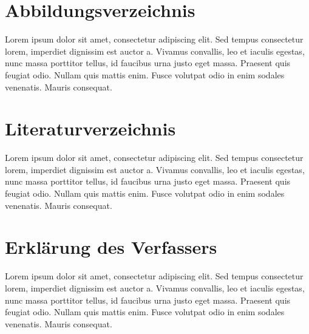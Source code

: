 \documentclass[a4paper,12pt]{article}			%
\begin{document}
\newpage
\section{Abbildungsverzeichnis}



Lorem ipsum dolor sit amet, consectetur adipiscing elit. Sed tempus consectetur lorem, imperdiet dignissim est auctor a. Vivamus convallis, leo et iaculis egestas, nunc massa porttitor tellus, id faucibus urna justo eget massa. Praesent quis feugiat odio. Nullam quis mattis enim. Fusce volutpat odio in enim sodales venenatis. Mauris consequat.


\newpage
\section{Literaturverzeichnis}



Lorem ipsum dolor sit amet, consectetur adipiscing elit. Sed tempus consectetur lorem, imperdiet dignissim est auctor a. Vivamus convallis, leo et iaculis egestas, nunc massa porttitor tellus, id faucibus urna justo eget massa. Praesent quis feugiat odio. Nullam quis mattis enim. Fusce volutpat odio in enim sodales venenatis. Mauris consequat.


\newpage
\section{Erklärung des Verfassers}



Lorem ipsum dolor sit amet, consectetur adipiscing elit. Sed tempus consectetur lorem, imperdiet dignissim est auctor a. Vivamus convallis, leo et iaculis egestas, nunc massa porttitor tellus, id faucibus urna justo eget massa. Praesent quis feugiat odio. Nullam quis mattis enim. Fusce volutpat odio in enim sodales venenatis. Mauris consequat.
\end{document}
